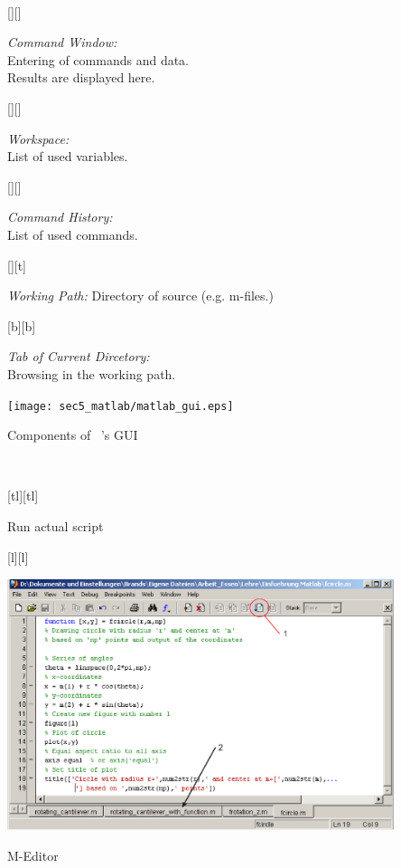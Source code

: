 $\phantom{x}$


\begin{Figure}[ht]
  \centering
  [][]{\parbox{6cm}{\footnotesize{\sl Command Window:}\\ 
                 Entering of commands and data.\\ Results are displayed here.}}
  [][]{\parbox{5cm}{\footnotesize{\sl Workspace:}\\ 
                 List of used variables.}}
  [][]{\parbox{5cm}{\footnotesize{\sl Command History:}\\
                 List of used commands.}}
  [][t]{\parbox{10cm}{\footnotesize{\sl Working Path:}
                 Directory of source (e.g. m-files.)}}
  [b][b]{\parbox{4.6cm}{\footnotesize{\sl Tab of Current Dircetory:}\\
                 Browsing in the working path.}}
  \texttt{[image: sec5\_matlab/matlab\_gui.eps]}
  \caption{Components of \matl\ 's GUI} 
\end{Figure}

\clearpage

$\phantom{x}$

\begin{Figure}[h]
  \centering
  [tl][tl]{\parbox{6cm}{\footnotesize\color{red}Run actual script}}
  [l][l]{\parbox{3cm}{\footnotesize {} }}
  \includegraphics[width=0.85\textwidth]{sec5_matlab/matlab_editor.eps}
  \caption{M-Editor} 
\end{Figure}

